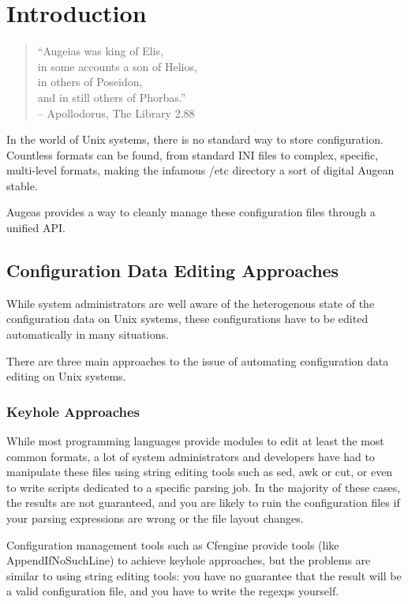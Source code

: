 \cleardoublepage
{}
{}
\chapter*{Introduction}

\begin{verse}
``Augeias was king of Elis, \\
in some accounts a son of Helios, \\
in others of Poseidon, \\
and in still others of Phorbas.'' \\
\small{-- Apollodorus, The Library 2.88}
\end{verse}

In the world of Unix systems, there is no standard way to store configuration. Countless formats can be found, from standard INI files to complex, specific, multi-level formats, making the infamous /etc directory a sort of digital Augean stable.

Augeas provides a way to cleanly manage these configuration files through a unified API.

\section{Configuration Data Editing Approaches}

While system administrators are well aware of the heterogenous state of the configuration data on Unix systems, these configurations have to be edited automatically in many situations.

There are three main approaches to the issue of automating configuration data editing on Unix systems.

\subsection{Keyhole Approaches}

While most programming languages provide modules to edit at least the most common formats, a lot of system administrators and developers have had to manipulate these files using string editing tools such as sed, awk or cut, or even to write scripts dedicated to a specific parsing job. In the majority of these cases, the results are not guaranteed, and you are likely to ruin the configuration files if your parsing expressions are wrong or the file layout changes.

Configuration management tools such as Cfengine provide tools (like AppendIfNoSuchLine) to achieve keyhole approaches, but the problems are similar to using string editing tools: you have no guarantee that the result will be a valid configuration file, and you have to write the regexps yourself.

